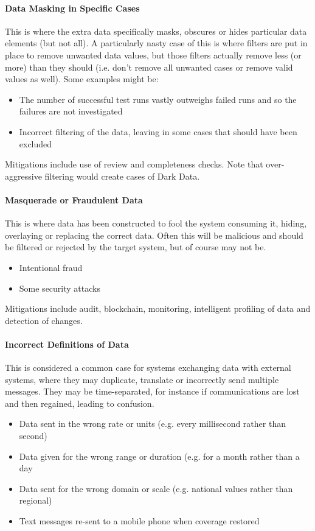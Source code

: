 \paragraph{Data Masking in Specific Cases}
This is where the extra data specifically masks, obscures or hides particular data elements (but not all). A particularly nasty case of this is where filters are put in place to remove unwanted data values, but those filters actually remove less (or more) than they should (i.e. don’t remove all unwanted cases or remove valid values as well). Some examples might be:
\begin{itemize}
    \item The number of successful test runs vastly outweighs failed runs and so the failures are not investigated
    \item Incorrect filtering of the data, leaving in some cases that should have been excluded
\end{itemize}

Mitigations include use of review and completeness checks. Note that over-aggressive filtering would create cases of Dark Data.
\paragraph{Masquerade or Fraudulent Data}
This is where data has been constructed to fool the system consuming it, hiding, overlaying or replacing the correct data. Often this will be malicious and should be filtered or rejected by the target system, but of course may not be. 
\begin{itemize}
    \item Intentional fraud
    \item Some security attacks
\end{itemize}

Mitigations include audit, blockchain, monitoring, intelligent profiling of data and detection of changes.

\paragraph{Incorrect Definitions of Data}
This is considered a common case for systems exchanging data with external systems, where they may duplicate, translate or incorrectly send multiple messages. They may be time-separated, for instance if communications are lost and then regained, leading to confusion.
\begin{itemize}
    \item Data sent in the wrong rate or units (e.g. every millisecond rather than second)
    \item Data given for the wrong range or duration (e.g. for a month rather than a day
    \item Data sent for the wrong domain or scale (e.g. national values rather than regional)
    \item Text messages re-sent to a mobile phone when coverage restored
\end{itemize}

